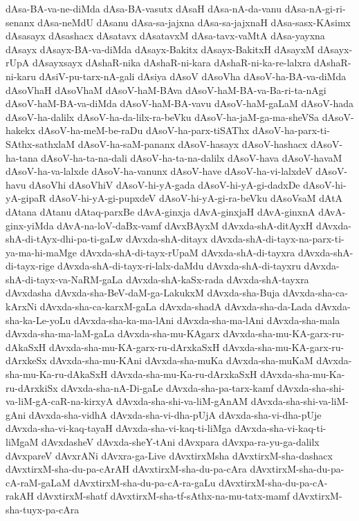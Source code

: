 {dAsa-BA-va-ne-diMda
dAsa-BA-vasutx
dAsaH
dAsa-nA-da-vanu
dAsa-nA-gi-ri-senanx
dAsa-neMdU
dAsanu
dAsa-sa-jajxna
dAsa-sa-jajxnaH
dAsa-sasx-KAsimx
dAsasayx
dAsashacx
dAsatavx
dAsatavxM
dAsa-tavx-vaMtA
dAsa-yayxna
dAsayx
dAsayx-BA-va-diMda
dAsayx-Bakitx
dAsayx-BakitxH
dAsayxM
dAsayx-rUpA
dAsayxsayx
dAshaR-nika
dAshaR-ni-kara
dAshaR-ni-ka-re-lalxra
dAshaR-ni-karu
dAsiV-pu-tarx-nA-gali
dAsiya
dAsoV
dAsoVha
dAsoV-ha-BA-va-diMda
dAsoVhaH
dAsoVhaM
dAsoV-haM-BAva
dAsoV-haM-BA-va-Ba-ri-ta-nAgi
dAsoV-haM-BA-va-diMda
dAsoV-haM-BA-vavu
dAsoV-haM-gaLaM
dAsoV-hada
dAsoV-ha-dalilx
dAsoV-ha-da-lilx-ra-beVku
dAsoV-ha-jaM-ga-ma-sheVSa
dAsoV-hakekx
dAsoV-ha-meM-be-raDu
dAsoV-ha-parx-tiSAThx
dAsoV-ha-parx-ti-SAthx-sathxlaM
dAsoV-ha-saM-pananx
dAsoV-hasayx
dAsoV-hashacx
dAsoV-ha-tana
dAsoV-ha-ta-na-dali
dAsoV-ha-ta-na-dalilx
dAsoV-hava
dAsoV-havaM
dAsoV-ha-va-lalxde
dAsoV-ha-vanunx
dAsoV-have
dAsoV-ha-vi-lalxdeV
dAsoV-havu
dAsoVhi
dAsoVhiV
dAsoV-hi-yA-gada
dAsoV-hi-yA-gi-dadxDe
dAsoV-hi-yA-gipaR
dAsoV-hi-yA-gi-pupxdeV
dAsoV-hi-yA-gi-ra-beVku
dAsoVsaM
dAtA
dAtana
dAtanu
dAtaq-parxBe
dAvA-ginxja
dAvA-ginxjaH
dAvA-ginxnA
dAvA-ginx-yiMda
dAvA-na-loV-daBx-vamf
dAvxBAyxM
dAvxda-shA-ditAyxH
dAvxda-shA-di-tAyx-dhi-pa-ti-gaLw
dAvxda-shA-ditayx
dAvxda-shA-di-tayx-na-parx-ti-ya-ma-hi-maMge
dAvxda-shA-di-tayx-rUpaM
dAvxda-shA-di-tayxra
dAvxda-shA-di-tayx-rige
dAvxda-shA-di-tayx-ri-lalx-daMdu
dAvxda-shA-di-tayxru
dAvxda-shA-di-tayx-va-NaRM-gaLa
dAvxda-shA-kaSx-rada
dAvxda-shA-tayxra
dAvxdasha
dAvxda-sha-BeV-daM-ga-LakukxM
dAvxda-sha-Buja
dAvxda-sha-ca-kArxNi
dAvxda-sha-ca-karxM-gaLa
dAvxda-shadA
dAvxda-sha-da-Lada
dAvxda-sha-ka-Le-yoLu
dAvxda-sha-ka-ma-lAni
dAvxda-sha-ma-lAni
dAvxda-sha-mala
dAvxda-sha-ma-laM-gaLa
dAvxda-sha-mu-KAgarx
dAvxda-sha-mu-KA-garx-ru-dAkaSxH
dAvxda-sha-mu-KA-garx-ru-dArxkaSxH
dAvxda-sha-mu-KA-garx-ru-dArxkeSx
dAvxda-sha-mu-KAni
dAvxda-sha-muKa
dAvxda-sha-muKaM
dAvxda-sha-mu-Ka-ru-dAkaSxH
dAvxda-sha-mu-Ka-ru-dArxkaSxH
dAvxda-sha-mu-Ka-ru-dArxkiSx
dAvxda-sha-nA-Di-gaLe
dAvxda-sha-pa-tarx-kamf
dAvxda-sha-shi-va-liM-gA-caR-na-kirxyA
dAvxda-sha-shi-va-liM-gAnAM
dAvxda-sha-shi-va-liM-gAni
dAvxda-sha-vidhA
dAvxda-sha-vi-dha-pUjA
dAvxda-sha-vi-dha-pUje
dAvxda-sha-vi-kaq-tayaH
dAvxda-sha-vi-kaq-ti-liMga
dAvxda-sha-vi-kaq-ti-liMgaM
dAvxdasheV
dAvxda-sheY-tAni
dAvxpara
dAvxpa-ra-yu-ga-dalilx
dAvxpareV
dAvxrANi
dAvxra-ga-Live
dAvxtirxMsha
dAvxtirxM-sha-dashacx
dAvxtirxM-sha-du-pa-cArAH
dAvxtirxM-sha-du-pa-cAra
dAvxtirxM-sha-du-pa-cA-raM-gaLaM
dAvxtirxM-sha-du-pa-cA-ra-gaLu
dAvxtirxM-sha-du-pa-cA-rakAH
dAvxtirxM-shatf
dAvxtirxM-sha-tf-sAthx-na-mu-tatx-mamf
dAvxtirxM-sha-tuyx-pa-cAra
}
